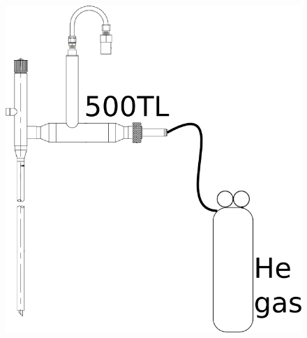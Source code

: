 \begin{figure}[htbp!]
 \centering
 \begin{minipage}{.48\textwidth}
 \includegraphics[width=\textwidth]{./img/100LDfill-01-blow-out-500TL.png}
 \label{fig:100LDfill-01-blow-out-500TL}
 \end{minipage}
 \quad
 \begin{minipage}{.48\textwidth}

\end{minipage}
\end{figure}
